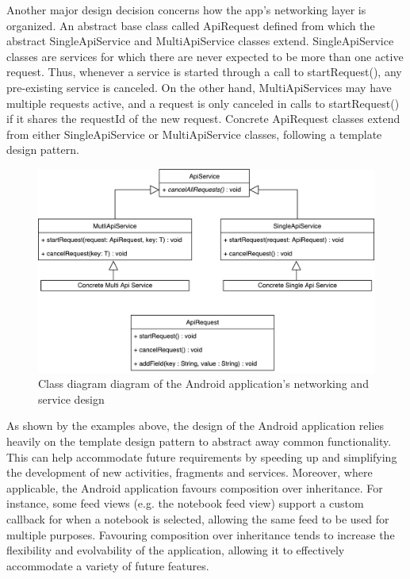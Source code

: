 \documentclass[12pt]{article}
\begin{document}
    Another major design decision concerns how the app's networking layer is organized. An abstract base class called ApiRequest defined from which the abstract
    SingleApiService and MultiApiService classes extend. SingleApiService classes are services for which there are never expected to be more than one active request. Thus, whenever
    a service is started through a call to startRequest(), any pre-existing service is canceled. On the other hand, MultiApiServices may have multiple requests active,
    and a request is only canceled in calls to startRequest() if it shares the requestId of the new request. Concrete ApiRequest classes extend from either
    SingleApiService or MultiApiService classes, following a template design pattern. \\

    \begin{figure}[H]
      \includegraphics[width=\textwidth]{assets/android-network-class.pdf}
      \caption{Class diagram diagram of the Android application's networking and service design}
    \end{figure}

    As shown by the examples above, the design of the Android application relies heavily on the template design pattern to abstract away common functionality. This can help
    accommodate future requirements by speeding up and simplifying the development of new activities, fragments and services. Moreover, where applicable, the Android application
    favours composition over inheritance. For instance, some feed views (e.g. the notebook feed view) support a custom callback for when a notebook is selected, allowing the same
    feed to be used for multiple purposes. Favouring composition over inheritance tends to increase the flexibility and evolvability of the application, allowing it to effectively
    accommodate a variety of future features. \\
\end{document}
